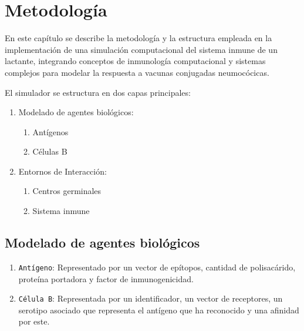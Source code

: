 \chapter{Metodología}\label{chapter:metodologia}

En este capítulo se describe la metodología y la estructura empleada en la implementación de una simulación computacional del sistema inmune de un lactante, integrando conceptos de inmunología computacional y sistemas complejos para modelar la respuesta a vacunas conjugadas neumocócicas.

El simulador se estructura en dos capas principales:
\begin{enumerate}
    \item Modelado de agentes biológicos:
        \begin{enumerate}
            \item Antígenos
            \item Células B
        \end{enumerate}
    \item Entornos de Interacción:
        \begin{enumerate}
            \item Centros germinales
            \item Sistema inmune
        \end{enumerate}
\end{enumerate}
\section{Modelado de agentes biológicos}
\begin{enumerate}
    
    \item \texttt{Antígeno}: Representado por un vector de epítopos, cantidad de polisacárido, proteína portadora y factor de inmunogenicidad.
    \item \texttt{Célula B}: 
    Representada por un identificador, un vector de receptores, un serotipo asociado que representa el antígeno que ha reconocido y una afinidad por este.
\end{enumerate}

    


